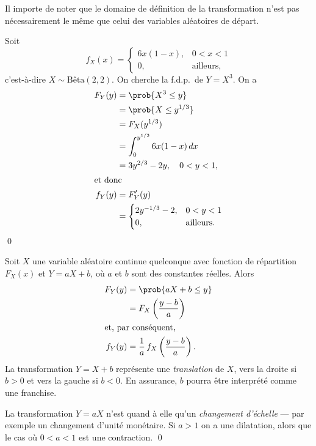 \begin{rem}
  Il importe de noter que le domaine de définition de la
  transformation n'est pas nécessairement le même que celui des
  variables aléatoires de départ.
\end{rem}

\begin{exemple}
  Soit
  \begin{displaymath}
    f_X(x) =
    \begin{cases}
      6x (1 - x), & 0 < x < 1 \\
      0, & \text{ailleurs},
    \end{cases}
  \end{displaymath}
  c'est-à-dire $X \sim \text{Bêta}(2, 2)$. On cherche la f.d.p.\ de $Y
  = X^3$. On a
  \begin{align*}
    F_Y(y)
    &= \prob{X^3 \leq y} \\
    &= \prob{X \leq y^{1/3}} \\
    &= F_X(y^{1/3}) \\
    &= \int_0^{y^{1/3}} 6x(1 - x)\, dx \\
    &= 3y^{2/3} - 2y, \quad 0 < y < 1, \\
    \intertext{et donc}
    f_Y(y)
    &= F_Y^\prime(y) \\
    &=
    \begin{cases}
      2y^{-1/3} - 2, & 0 < y < 1 \\
      0, & \text{ailleurs}.
    \end{cases}
  \end{align*}
  \qed
\end{exemple}

\begin{exemple}
  Soit $X$ une variable aléatoire continue quelconque avec fonction de
  répartition $F_X(x)$ et $Y = aX + b$, où $a$ et $b$ sont des
  constantes réelles. Alors
  \begin{align*}
    F_Y(y)
    &= \prob{a X + b \leq y} \\
    &= F_X\left( \frac{y - b}{a} \right) \\
    \intertext{et, par conséquent,}
    f_Y(y)
    &= \frac{1}{a}\, f_X\left( \frac{y - b}{a} \right).
  \end{align*}
  La transformation $Y = X + b$ représente une \emph{translation} de
  $X$, vers la droite si $b > 0$ et vers la gauche si $b < 0$. En
  assurance, $b$ pourra être interprété comme une franchise.

  La transformation $Y = aX$ n'est quand à elle qu'un \emph{changement
    d'échelle} --- par exemple un changement d'unité monétaire. Si $a
  > 1$ on a une dilatation, alors que le cas où $0 < a < 1$ est une
  contraction. %
  \qed
\end{exemple}


